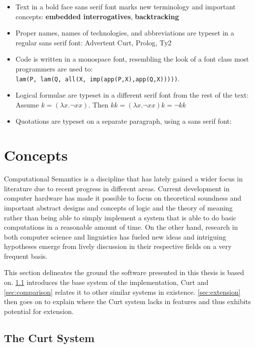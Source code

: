 \documentclass[a4paper]{article}
\newcommand{\term}[1]{\textsf{\textbf{#1}}} %
\newcommand{\code}[1]{\texttt{#1}} %
\newcommand{\pn}{\textsf} %
\newcommand{\quotesf}[1]{\quote{\textsf{#1}}}
\newcommand{\curt}{\pn{Curt}}
\newcommand{\acurt}{\pn{Advertent Curt}}
\newcommand{\prol}{\pn{Prolog}}
\theoremstyle{remark}
\theoremstyle{remark}
\theoremstyle{definition}
\theoremstyle{definition}
\begin{document}
\begin{itemize}
  \item Text in a bold face sans serif font marks new terminology and important
  concepts: \term{embedded interrogatives}, \term{backtracking}
  \item Proper names, names of technologies, and abbreviations are typeset in a
  regular sans serif font: \acurt, \prol, \pn{Ty2}
  \item Code is written in a monospace font, resembling the look of a font class most
  programmers are used to:\\
  \code{lam(P, lam(Q, all(X, imp(app(P,X),app(Q,X)))))}.
  \item Logical formulae are typeset in a different serif font from the rest of
  the text:\\
    Assume $k = (\lambda x.\neg xx)$. Then $ kk = (\lambda x .\neg xx)k = \neg kk$
  \item Quotations  are typeset on a separate paragraph, using a sans serif font:
  \quotesf{This answers the question!}
\end{itemize}


\section{Concepts}

Computational Semantics is a discipline that has  lately gained a wider focus in
literature due to recent progress in different areas.  Current development in
computer hardware has made it possible to focus on theoretical soundness and
important abstract designs and concepts of logic and the theory of meaning
rather than being able to simply implement a system that is able to do basic
computations in a reasonable amount of time. On the other hand, research in both
computer science and linguistics has fueled new ideas and intriguing hypotheses
emerge from lively discussion in their respective fields on a very frequent
basis.

This section delineates the ground the software presented in this thesis is
based on. \ref{sec:curt} introduces the base system of the implementation,
\curt{}
and \ref{sec:comparison} relates it to other similar systems in existence.
\ref{sec:extension} then goes on to explain where the \curt{} system lacks in
features and thus exhibits potential for extension.

\subsection{The Curt System} \label{sec:curt}
\end{document}
